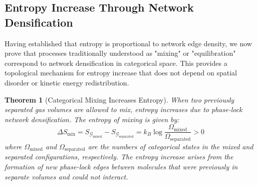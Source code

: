 \documentclass[12pt,a4paper]{article}
\newtheorem{theorem}{Theorem}[section]
\theoremstyle{definition}
\theoremstyle{remark}
\newcommand{\phaselockgraph}{\mathcal{G}}
\begin{document}
\subsection{Entropy Increase Through Network Densification}

Having established that entropy is proportional to network edge density, we now prove that processes traditionally understood as "mixing" or "equilibration" correspond to network densification in categorical space. This provides a topological mechanism for entropy increase that does not depend on spatial disorder or kinetic energy redistribution.

\begin{theorem}[Categorical Mixing Increases Entropy]
\label{thm:mixing_entropy}
When two previously separated gas volumes are allowed to mix, entropy increases due to phase-lock network densification. The entropy of mixing is given by:
\begin{equation}
\Delta S_{\text{mix}} = S_{\phaselockgraph_{\text{mixed}}} - S_{\phaselockgraph_{\text{separated}}} = k_B \log \frac{\Omega_{\text{mixed}}}{\Omega_{\text{separated}}} > 0
\label{eq:mixing_entropy}
\end{equation}
where $\Omega_{\text{mixed}}$ and $\Omega_{\text{separated}}$ are the numbers of categorical states in the mixed and separated configurations, respectively. The entropy increase arises from the formation of new phase-lock edges between molecules that were previously in separate volumes and could not interact.
\end{theorem}
\end{document}
